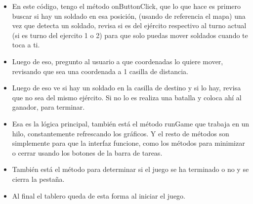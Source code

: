 \documentclass{article}
\begin{document}
	\begin{itemize}
		\item En este código, tengo el método onButtonClick, que lo que hace es primero buscar si hay un soldado en esa posición, (usando de referencia el mapa) una vez que detecta un soldado, revisa si es del ejército respectivo al turno actual (si es turno del ejercito 1 o 2) para que solo puedas mover soldados cuando te toca a ti.
		\item Luego de eso, pregunto al usuario a que coordenadas lo quiere mover, revisando que sea una coordenada a 1 casilla de distancia.
		\item Luego de eso ve si hay un soldado en la casilla de destino y si lo hay, revisa que no sea del mismo ejército. Si no lo es realiza una batalla y coloca ahí al ganador, para terminar.
		 \item Esa es la lógica principal, también está el método runGame que trabaja en un hilo, constantemente refrescando los gráficos. Y el resto de métodos son simplemente para que la interfaz funcione, como los métodos para minimizar o cerrar usando los botones de la barra de tareas. 
		 \item También está el método para determinar si el juego se ha terminado o no y se cierra la pestaña.
		 
		 \item Al final el tablero queda de esta forma al iniciar el juego.
	\end{itemize}
	
\end{document}

